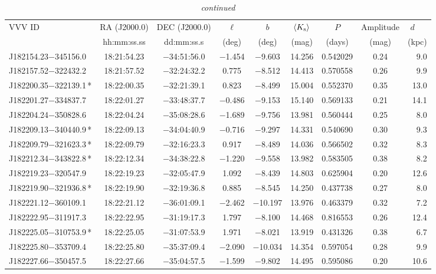 \begin{table*}
\centering
\caption[]{{\it continued}}
\begin{tabular}{lcccccccr}
\hline \hline
VVV ID & RA (J2000.0)  & DEC (J2000.0) & $\ell$ & $b$ &  $\langle K_{\rm s} \rangle$ & $P$ & Amplitude & $d$~~~ \\
     & hh:mm:ss.ss    & dd:mm:ss.s   &  (deg) & (deg) &   (mag)       & (days) & (mag) & (kpc)   \\
\hline
J182154.23$-$345156.0 & 18:21:54.23 & $-$34:51:56.0 & $-$1.454 & $-$9.603 & 14.256 & 0.542029 & 0.24 & 9.0 \\
J182157.52$-$322432.2 & 18:21:57.52 & $-$32:24:32.2 &  0.775 & $-$8.512 & 14.413 & 0.570558 & 0.26 & 9.9 \\
J182200.35$-$322139.1\,* & 18:22:00.35 & $-$32:21:39.1 &  0.823 & $-$8.499 & 15.004 & 0.552370 & 0.35 & 13.0 \\
J182201.27$-$334837.7 & 18:22:01.27 & $-$33:48:37.7 & $-$0.486 & $-$9.153 & 15.140 & 0.569133 & 0.21 & 14.1 \\
J182204.24$-$350828.6 & 18:22:04.24 & $-$35:08:28.6 & $-$1.689 & $-$9.756 & 13.981 & 0.560444 & 0.25 & 8.0 \\
J182209.13$-$340440.9\,* & 18:22:09.13 & $-$34:04:40.9 & $-$0.716 & $-$9.297 & 14.331 & 0.540690 & 0.30 & 9.3 \\
J182209.79$-$321623.3\,* & 18:22:09.79 & $-$32:16:23.3 &  0.917 & $-$8.489 & 14.036 & 0.566502 & 0.32 & 8.3 \\
J182212.34$-$343822.8\,* & 18:22:12.34 & $-$34:38:22.8 & $-$1.220 & $-$9.558 & 13.982 & 0.583505 & 0.38 & 8.2 \\
J182219.23$-$320547.9 & 18:22:19.23 & $-$32:05:47.9 &  1.092 & $-$8.439 & 14.803 & 0.625904 & 0.20 & 12.6 \\
J182219.90$-$321936.8\,* & 18:22:19.90 & $-$32:19:36.8 &  0.885 & $-$8.545 & 14.250 & 0.437738 & 0.27 & 8.0 \\
J182221.12$-$360109.1 & 18:22:21.12 & $-$36:01:09.1 & $-$2.462 & $-$10.197 & 13.976 & 0.463379 & 0.32 & 7.2 \\
J182222.95$-$311917.3 & 18:22:22.95 & $-$31:19:17.3 &  1.797 & $-$8.100 & 14.468 & 0.816553 & 0.26 & 12.4 \\
J182225.05$-$310753.9\,* & 18:22:25.05 & $-$31:07:53.9 &  1.971 & $-$8.021 & 13.919 & 0.431326 & 0.38 & 6.7 \\
J182225.80$-$353709.4 & 18:22:25.80 & $-$35:37:09.4 & $-$2.090 & $-$10.034 & 14.354 & 0.597054 & 0.28 & 9.9 \\
J182227.66$-$350457.5 & 18:22:27.66 & $-$35:04:57.5 & $-$1.599 & $-$9.802 & 14.495 & 0.595086 & 0.20 & 10.6 \\

\end{tabular}
\end{table*}
